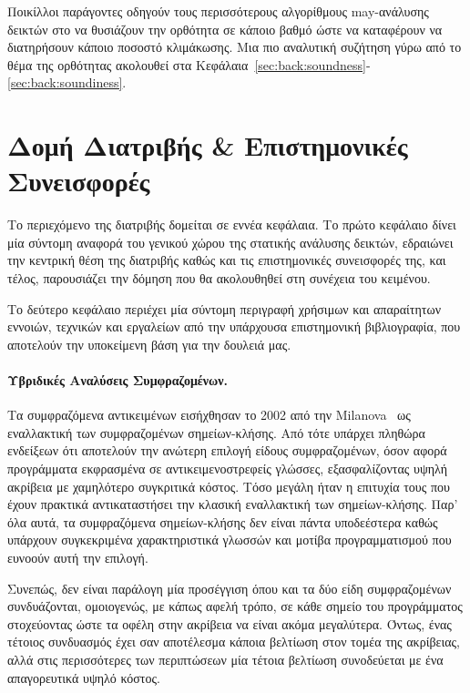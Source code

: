 Ποικίλλοι παράγοντες οδηγούν τους περισσότερους αλγορίθμους {\en may}-ανάλυσης δεικτών στο να θυσιάζουν την ορθότητα σε κάποιο βαθμό ώστε να καταφέρουν να διατηρήσουν κάποιο ποσοστό κλιμάκωσης. Μια πιο αναλυτική συζήτηση γύρω από το θέμα της ορθότητας ακολουθεί στα Κεφάλαια~\ref{sec:back:soundness}-\ref{sec:back:soundiness}.



\section*{Δομή Διατριβής \& Επιστημονικές Συνεισφορές}

Το περιεχόμενο της διατριβής δομείται σε εννέα κεφάλαια. Το πρώτο κεφάλαιο δίνει μία σύντομη αναφορά του γενικού χώρου της στατικής ανάλυσης δεικτών, εδραιώνει την κεντρική θέση της διατριβής καθώς και τις επιστημονικές συνεισφορές της, και τέλος, παρουσιάζει την δόμηση που θα ακολουθηθεί στη συνέχεια του κειμένου.

Το δεύτερο κεφάλαιο περιέχει μία σύντομη περιγραφή χρήσιμων και απαραίτητων εννοιών, τεχνικών και εργαλείων από την υπάρχουσα επιστημονική βιβλιογραφία, που αποτελούν την υποκείμενη βάση για την δουλειά μας.


\paragraph*{Υβριδικές Αναλύσεις Συμφραζομένων.}
Τα συμφραζόμενα αντικειμένων εισήχθησαν το 2002 από την {\en Milanova}~\cite{issta:2002:Milanova} ως εναλλακτική των συμφραζομένων σημείων-κλήσης. Από τότε υπάρχει πληθώρα ενδείξεων ότι αποτελούν την ανώτερη επιλογή είδους συμφραζομένων, όσον αφορά προγράμματα εκφρασμένα σε αντικειμενοστρεφείς γλώσσες, εξασφαλίζοντας υψηλή ακρίβεια με χαμηλότερο συγκριτικά κόστος. Τόσο μεγάλη ήταν η επιτυχία τους που έχουν πρακτικά αντικαταστήσει την κλασική εναλλακτική των σημείων-κλήσης. Παρ' όλα αυτά, τα συμφραζόμενα σημείων-κλήσης δεν είναι πάντα υποδεέστερα καθώς υπάρχουν συγκεκριμένα χαρακτηριστικά γλωσσών και μοτίβα προγραμματισμού που ευνοούν αυτή την επιλογή.

Συνεπώς, δεν είναι παράλογη μία προσέγγιση όπου και τα δύο είδη συμφραζομένων συνδυάζονται, ομοιογενώς, με κάπως αφελή τρόπο, σε κάθε σημείο του προγράμματος στοχεύοντας ώστε τα οφέλη στην ακρίβεια να είναι ακόμα μεγαλύτερα. Όντως, ένας τέτοιος συνδυασμός έχει σαν αποτέλεσμα κάποια βελτίωση στον τομέα της ακρίβειας, αλλά στις περισσότερες των περιπτώσεων μία τέτοια βελτίωση συνοδεύεται με ένα απαγορευτικά υψηλό κόστος.

